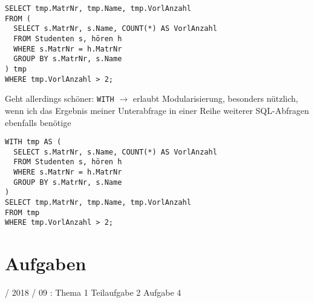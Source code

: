\documentclass{lehramt-informatik}
\begin{document}
\begin{verbatim}
SELECT tmp.MatrNr, tmp.Name, tmp.VorlAnzahl
FROM (
  SELECT s.MatrNr, s.Name, COUNT(*) AS VorlAnzahl
  FROM Studenten s, hören h
  WHERE s.MatrNr = h.MatrNr
  GROUP BY s.MatrNr, s.Name
) tmp
WHERE tmp.VorlAnzahl > 2;
\end{verbatim}

\noindent
Geht allerdings schöner: \verb|WITH| $\rightarrow$ erlaubt
Modularisierung, besonders nützlich, wenn ich das Ergebnis meiner
Unterabfrage in einer Reihe weiterer SQL-Abfragen ebenfalls benötige

\begin{verbatim}
WITH tmp AS (
  SELECT s.MatrNr, s.Name, COUNT(*) AS VorlAnzahl
  FROM Studenten s, hören h
  WHERE s.MatrNr = h.MatrNr
  GROUP BY s.MatrNr, s.Name
)
SELECT tmp.MatrNr, tmp.Name, tmp.VorlAnzahl
FROM tmp
WHERE tmp.VorlAnzahl > 2;
\end{verbatim}


\chapter{Aufgaben}

%

 / 2018 / 09 : Thema 1 Teilaufgabe 2 Aufgabe 4

\literatur
\end{document}
